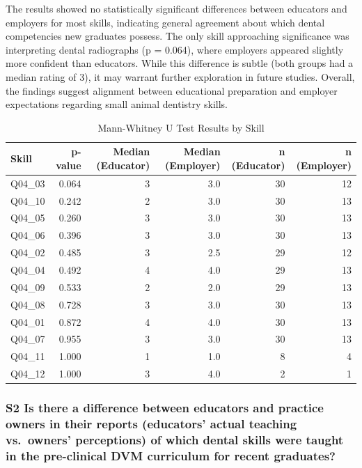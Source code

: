 \documentclass[
  11pt,
  letterpaper,
  DIV=11,
  numbers=noendperiod]{scrartcl}
\numberwithin{figure}{section}
\begin{document}
The results showed no statistically significant differences between
educators and employers for most skills, indicating general agreement
about which dental competencies new graduates possess. The only skill
approaching significance was interpreting dental radiographs (p =
0.064), where employers appeared slightly more confident than educators.
While this difference is subtle (both groups had a median rating of 3),
it may warrant further exploration in future studies. Overall, the
findings suggest alignment between educational preparation and employer
expectations regarding small animal dentistry skills.

\begin{table}
\caption*{
{\large Mann-Whitney U Test Results by Skill}
} 
\fontsize{12.0pt}{14.4pt}\selectfont
\begin{tabular*}{\linewidth}{@{\extracolsep{\fill}}lrrrrr}
\toprule
Skill & p-value & Median (Educator) & Median (Employer) & n (Educator) & n (Employer) \\ 
\midrule\addlinespace[2.5pt]
Q04\_03 & 0.064 & 3 & 3.0 & 30 & 12 \\ 
Q04\_10 & 0.242 & 2 & 3.0 & 30 & 13 \\ 
Q04\_05 & 0.260 & 3 & 3.0 & 30 & 13 \\ 
Q04\_06 & 0.396 & 3 & 3.0 & 30 & 13 \\ 
Q04\_02 & 0.485 & 3 & 2.5 & 29 & 12 \\ 
Q04\_04 & 0.492 & 4 & 4.0 & 29 & 13 \\ 
Q04\_09 & 0.533 & 2 & 2.0 & 29 & 13 \\ 
Q04\_08 & 0.728 & 3 & 3.0 & 30 & 13 \\ 
Q04\_01 & 0.872 & 4 & 4.0 & 30 & 13 \\ 
Q04\_07 & 0.955 & 3 & 3.0 & 30 & 13 \\ 
Q04\_11 & 1.000 & 1 & 1.0 & 8 & 4 \\ 
Q04\_12 & 1.000 & 3 & 4.0 & 2 & 1 \\ 
\bottomrule
\end{tabular*}
\end{table}

\subsubsection{S2 Is there a difference between educators and practice
owners in their reports (educators' actual teaching vs.~owners'
perceptions) of which dental skills were taught in the pre-clinical DVM
curriculum for recent
graduates?}\label{s2-is-there-a-difference-between-educators-and-practice-owners-in-their-reports-educators-actual-teaching-vs.-owners-perceptions-of-which-dental-skills-were-taught-in-the-pre-clinical-dvm-curriculum-for-recent-graduates}
\end{document}
